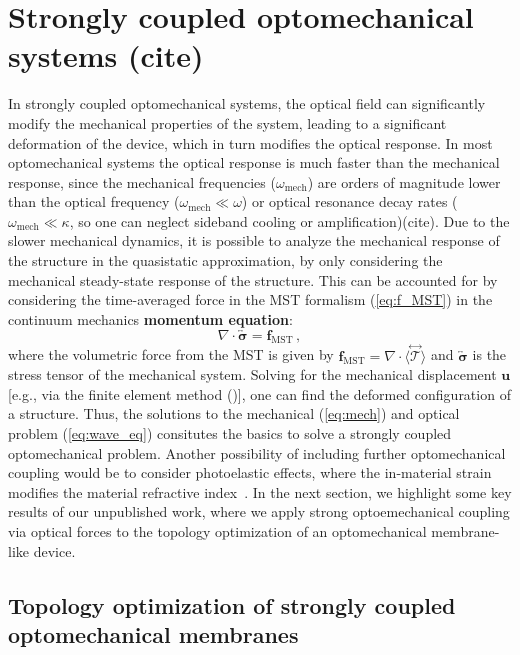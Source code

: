 \section{Strongly coupled optomechanical systems (cite)}\label{sec:mech_strongly_coupled}

In strongly coupled optomechanical systems, the optical field can significantly modify the mechanical properties of the system, leading to a significant deformation
of the device, which in turn modifies the optical response. In most optomechanical systems the optical response is much faster than the mechanical response, since the 
mechanical frequencies ($\omega_\text{mech}$) are orders of magnitude lower than the optical frequency ($\omega_\text{mech}\ll\omega$) or optical resonance decay rates ($\omega_\text{mech}\ll\kappa$, so one 
can neglect sideband cooling or amplification)\cite{opto_crys, photo_topopt}(cite). Due to the slower mechanical dynamics, it is possible to analyze the mechanical response of the structure in the quasistatic approximation, by only considering the mechanical steady-state response of the structure. 
This can be accounted for by considering the time-averaged force in the MST formalism (\eqref{eq:f_MST}) in the continuum mechanics \textbf{momentum equation}:
\begin{equation}\label{eq:mech}
    \nabla \cdot \overleftrightarrow{\boldsymbol{\sigma}} = \mathbf{f}_\text{MST}  \,,
\end{equation}
where the volumetric force from the MST is given by $ \mathbf{f}_\text{MST} = \nabla \cdot \langle \stackrel{\leftrightarrow}{\bm{\mathcal{T}}} \rangle$ and $\overleftrightarrow{\boldsymbol{\sigma}}$ is the stress tensor of the mechanical system. Solving for the mechanical
displacement $\mathbf{u}$ [e.g., via the finite element method ()], one can find the deformed configuration of a structure. Thus, the solutions to the mechanical (\eqref{eq:mech}) and optical problem
(\eqref{eq:wave_eq}) consitutes the basics to solve a strongly coupled optomechanical problem. Another possibility of including further optomechanical coupling would be to consider
photoelastic effects, where the in-material strain modifies the material refractive index~\cite{photoelasticity}.  In the next section, we highlight some key results of our unpublished work, where we apply strong optoemechanical coupling
via optical forces to the 
topology optimization of an optomechanical membrane-like device.

\subsection*{Topology optimization of strongly coupled optomechanical membranes}

